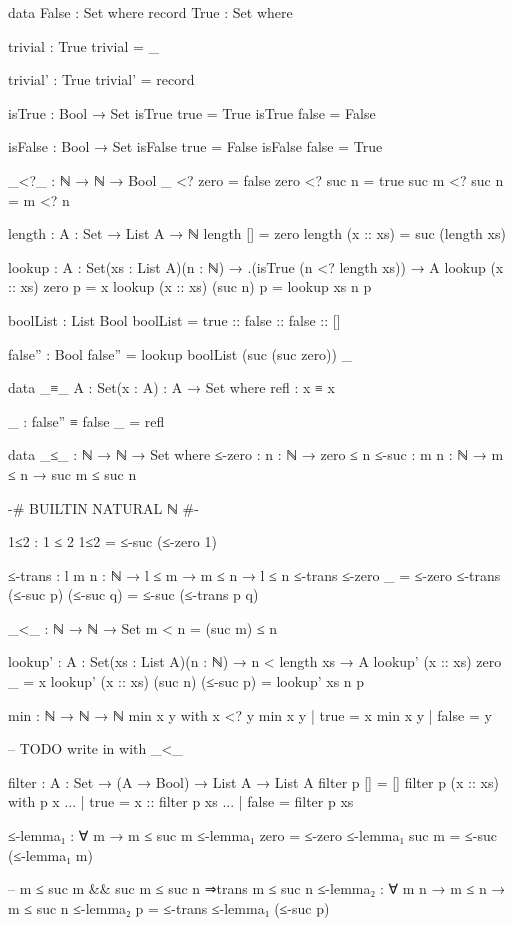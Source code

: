\begin{code}
data False : Set where
record True : Set where

trivial : True
trivial = _

trivial' : True
trivial' = record{}

isTrue : Bool → Set
isTrue true = True
isTrue false = False

isFalse : Bool → Set
isFalse true = False
isFalse false = True

_<?_ : ℕ → ℕ → Bool
_     <?  zero = false
zero  <? suc n = true
suc m <? suc n = m <? n

length : {A : Set} → List A → ℕ
length [] = zero
length (x :: xs) = suc (length xs)

lookup : {A : Set}(xs : List A)(n : ℕ)
  → .(isTrue (n <? length xs))
  → A
lookup (x :: xs) zero p = x
lookup (x :: xs) (suc n) p = lookup xs n p

boolList : List Bool
boolList = true :: false :: false :: []

false'' : Bool
false'' = lookup boolList (suc (suc zero)) _

data _≡_ {A : Set}(x : A) : A → Set where
  refl : x ≡ x

_ : false'' ≡ false
_ = refl

data _≤_ : ℕ → ℕ → Set where
  ≤-zero : {n : ℕ} → zero ≤ n
  ≤-suc  : {m n : ℕ} → m ≤ n → suc m ≤ suc n
  
{-# BUILTIN NATURAL ℕ #-}

1≤2 : 1 ≤ 2
1≤2 = ≤-suc (≤-zero {1})

≤-trans : {l m n : ℕ} → l ≤ m → m ≤ n → l ≤ n
≤-trans ≤-zero _ = ≤-zero
≤-trans (≤-suc p) (≤-suc q) = ≤-suc (≤-trans p q)

_<_ :  ℕ → ℕ → Set
m < n = (suc m) ≤ n

lookup' : {A : Set}(xs : List A)(n : ℕ)
  → n < length xs
  → A
lookup' (x :: xs) zero _ = x
lookup' (x :: xs) (suc n) (≤-suc p) = lookup' xs n p

min : ℕ → ℕ → ℕ
min x y with x <? y
min x y | true = x
min x y | false = y

-- TODO write in with _<_

filter : {A : Set} → (A → Bool) → List A → List A
filter p [] = []
filter p (x :: xs) with p x
... | true = x :: filter p xs
... | false = filter p xs

≤-lemma₁ : ∀ {m} → m ≤ suc m
≤-lemma₁ {zero} = ≤-zero
≤-lemma₁ {suc m} = ≤-suc (≤-lemma₁ {m})

-- m ≤ suc m && suc m ≤ suc n ⇒{trans} m ≤ suc n
≤-lemma₂ : ∀ {m n} → m ≤ n → m ≤ suc n
≤-lemma₂ p = ≤-trans ≤-lemma₁ (≤-suc p)


\end{code}
